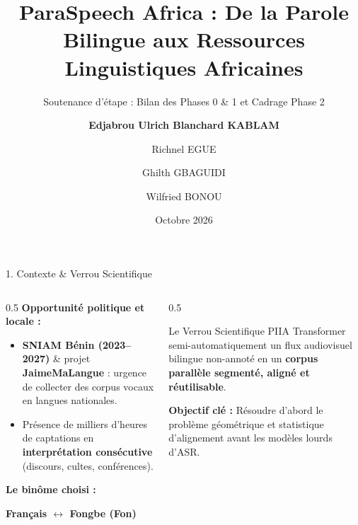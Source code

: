 \documentclass[aspectratio=169,10pt]{beamer}
\title[\textbf{ParaSpeech Africa -- PIIA Cohorte 2}]{\textbf{ParaSpeech Africa : De la Parole Bilingue aux Ressources Linguistiques Africaines}}
\subtitle{Soutenance d'étape : Bilan des Phases 0 \& 1 et Cadrage Phase 2}
\author[E. U. B. KABLAM et al.]{
    \textbf{Edjabrou Ulrich Blanchard KABLAM} \and Richnel EGUE \\
    \and Ghilth GBAGUIDI \and Wilfried BONOU
}
\institute[AMA]{Académie des Mathématiques Appliquées (AMA) \\ Spécialité Machine Learning -- Promotion 2026--2027}
\date{Octobre 2026}
\begin{document}
\begin{frame}
  \titlepage
\end{frame}

\begin{frame}{1. Contexte \& Verrou Scientifique}
\begin{columns}[T]
    \begin{column}{0.5\textwidth}
        \textbf{Opportunité politique et locale :}
        \begin{itemize}
            \item \textbf{SNIAM Bénin (2023--2027)} \& projet \textbf{JaimeMaLangue} : urgence de collecter des corpus vocaux en langues nationales.
            \item Présence de milliers d'heures de captations en \textbf{interprétation consécutive} (discours, cultes, conférences).
        \end{itemize}
        \vspace{0.2cm}
        \textbf{Le binôme choisi :}
        \begin{center}
            \color{amared}\textbf{Français $\longleftrightarrow$ Fongbe (Fon)}
        \end{center}
    \end{column}
    \begin{column}{0.5\textwidth}
        \begin{block}{Le Verrou Scientifique PIIA}
            Transformer semi-automatiquement un flux audiovisuel bilingue non-annoté en un \textbf{corpus parallèle segmenté, aligné et réutilisable}.
        \end{block}
        \vspace{0.3cm}
        \alert{\textbf{Objectif clé :}} Résoudre d'abord le problème géométrique et statistique d'alignement avant les modèles lourds d'ASR.
    \end{column}
\end{columns}
\end{frame}
\end{document}
